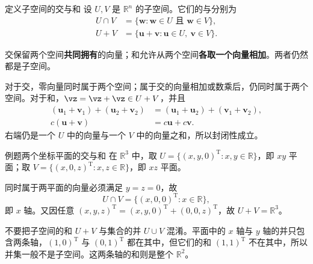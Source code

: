 \documentclass[a4paper,12pt,twoside,openany,fontset=none]{ctexbook}
\newcounter{definition}[chapter]
\newenvironment{definition}[1][]{\begin{defBox}{定义}{#1}}{\end{defBox}}
\newcounter{example}[chapter]
\newenvironment{example}[1][]{\begin{exBox}{例题}{#1}}{\end{exBox}}
\numberwithin{equation}{chapter}
\begin{document}
\begin{definition}[子空间的交与和]
设 $U,V$ 是 $\mathbb{R}^n$ 的子空间。它们的\textbf{}与\textbf{}分别为
\[
\begin{aligned}
    U\cap V&=\{\boldsymbol{w}:\boldsymbol{w}\in U\text{ 且 }\boldsymbol{w}\in V\},\\
    U+V&=\{\boldsymbol{u}+\boldsymbol{v}:\boldsymbol{u}\in U,\ \boldsymbol{v}\in V\}.
\end{aligned}
\]
\end{definition}

交保留两个空间\textbf{共同拥有}的向量；和允许从两个空间\textbf{各取一个向量相加}。两者仍然都是子空间。

对于交，零向量同时属于两个空间；属于交的向量相加或数乘后，仍同时属于两个空间。对于和，$\vz=\vz+\vz\in U+V$，并且
\[
\begin{aligned}
(\boldsymbol{u}_1+\boldsymbol{v}_1)+(\boldsymbol{u}_2+\boldsymbol{v}_2)
    &=(\boldsymbol{u}_1+\boldsymbol{u}_2)+(\boldsymbol{v}_1+\boldsymbol{v}_2),\\
c(\boldsymbol{u}+\boldsymbol{v})&=c\boldsymbol{u}+c\boldsymbol{v}.
\end{aligned}
\]
右端仍是一个 $U$ 中的向量与一个 $V$ 中的向量之和，所以封闭性成立。

\begin{example}[两个坐标平面的交与和]
在 $\mathbb{R}^3$ 中，取 $U=\{(x,y,0)^{\mathrm T}:x,y\in\mathbb{R}\}$，即 $xy$ 平面；取 $V=\{(x,0,z)^{\mathrm T}:x,z\in\mathbb{R}\}$，即 $xz$ 平面。

同时属于两平面的向量必须满足 $y=z=0$，故
\[
    U\cap V=\{(x,0,0)^{\mathrm T}:x\in\mathbb{R}\},
\]
即 $x$ 轴。又因任意 $(x,y,z)^{\mathrm T}=(x,y,0)^{\mathrm T}+(0,0,z)^{\mathrm T}$，故 $U+V=\mathbb{R}^3$。
\end{example}

不要把子空间的和 $U+V$ 与集合的并 $U\cup V$ 混淆。平面中的 $x$ 轴与 $y$ 轴的并只包含两条轴，$(1,0)^{\mathrm T}$ 与 $(0,1)^{\mathrm T}$ 都在其中，但它们的和 $(1,1)^{\mathrm T}$ 不在其中，所以并集一般不是子空间。这两条轴的和则是整个 $\mathbb{R}^2$。
\end{document}
